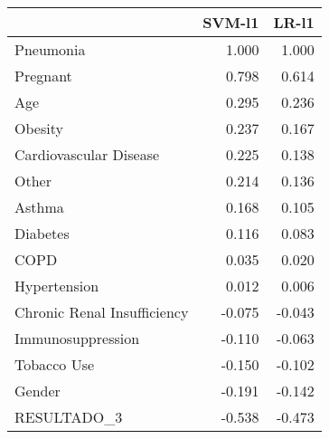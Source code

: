\begin{tabular}{lrr}
\toprule
{} &  SVM-l1 &  LR-l1 \\
\midrule
Pneumonia                   &   1.000 &  1.000 \\
Pregnant                    &   0.798 &  0.614 \\
Age                         &   0.295 &  0.236 \\
Obesity                     &   0.237 &  0.167 \\
Cardiovascular Disease      &   0.225 &  0.138 \\
Other                       &   0.214 &  0.136 \\
Asthma                      &   0.168 &  0.105 \\
Diabetes                    &   0.116 &  0.083 \\
COPD                        &   0.035 &  0.020 \\
Hypertension                &   0.012 &  0.006 \\
Chronic Renal Insufficiency &  -0.075 & -0.043 \\
Immunosuppression           &  -0.110 & -0.063 \\
Tobacco Use                 &  -0.150 & -0.102 \\
Gender                      &  -0.191 & -0.142 \\
RESULTADO\_3                 &  -0.538 & -0.473 \\
\bottomrule
\end{tabular}
